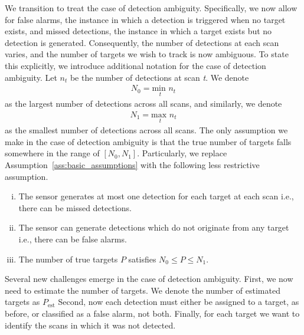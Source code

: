 We transition to treat the case of detection ambiguity. Specifically, we now allow for false alarms, the instance in which a detection is triggered when no target exists, and missed detections, the instance in which a target exists but no detection is generated. Consequently, the number of detections at each scan varies, and the number of targets we wish to track is now ambiguous. To state this explicitly, we introduce additional notation for the case of detection ambiguity. Let $n_{t}$ be the number of detections at scan \textit{t}. We denote 
\begin{align*}
N_{0} = \underset{t}{\text{min }} n_{t}
\end{align*}
as the largest number of detections across all scans, and similarly, we denote
\begin{align*}
N_{1} = \underset{t}{\text{max }}  n_{t}
\end{align*}
as the smallest number of detections across all scans. The only assumption we make in the case of detection ambiguity is that the true number of targets falls somewhere in the range of $[N_{0},N_{1}]$. Particularly, we replace Assumption~\ref{ass:basic_assumptions} with the following less restrictive assumption.
\begin{assumption}\label{ass:robust_assumptions}
\leavevmode
\begin{enumerate}[(i)]
\item The sensor generates at most one detection for each target
 at each scan i.e., there can be missed detections.
\item The sensor can generate detections which do not originate from any target
i.e., there can be false alarms.
\item The number of true targets $P$ satisfies $N_0\leq P \leq N_1$.
\end{enumerate}
\end{assumption}

Several new challenges emerge in the case of detection ambiguity. First, we now need to estimate the number of targets. We denote the number of estimated targets as $P_{\text{est}}$ Second, now each detection must either be assigned to a target, as before, or classified as a false alarm, not both. Finally, for each target we want to identify the scans in which it was not detected. 


